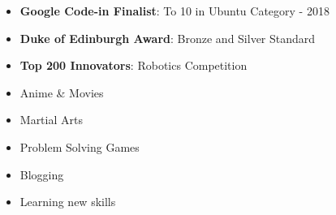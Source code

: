 \documentclass[10pt,a4paper,ragged2e,withhyper]{altacv}
\begin{document}
\begin{paracol}{2}
\switchcolumn


\begin{itemize}[left=0pt]
    \item \textbf{\textcolor{DarkPastelRed}{Google Code-in Finalist}}: To 10 in Ubuntu Category - 2018
    \item \textbf{\textcolor{DarkPastelRed}{Duke of Edinburgh Award}}: Bronze and Silver Standard
    \item \textbf{\textcolor{DarkPastelRed}{Top 200 Innovators}}: Robotics Competition
\end{itemize}


\begin{multicols}{2}
\begin{itemize}[label=\textcolor{DarkPastelRed}{$\triangleright$}]
\item Anime \& Movies
\item Martial Arts
\item Problem Solving Games
\item Blogging
\item Learning new skills 
\end{itemize}
\end{multicols}

\end{paracol}
\end{document}
